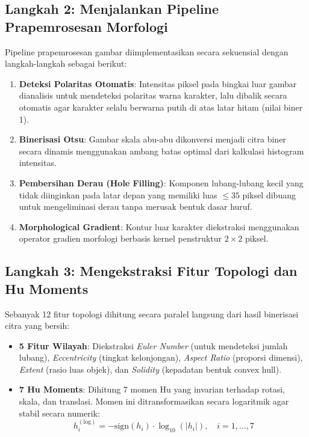 \documentclass[12pt,a4paper]{article}
\begin{document}
\subsection*{Langkah 2: Menjalankan Pipeline Prapemrosesan Morfologi}
Pipeline prapemrosesan gambar diimplementasikan secara sekuensial dengan langkah-langkah sebagai berikut:
\begin{enumerate}
    \item \textbf{Deteksi Polaritas Otomatis}: Intensitas piksel pada bingkai luar gambar dianalisis untuk mendeteksi polaritas warna karakter, lalu dibalik secara otomatis agar karakter selalu berwarna putih di atas latar hitam (nilai biner 1).
    \item \textbf{Binerisasi Otsu}: Gambar skala abu-abu dikonversi menjadi citra biner secara dinamis menggunakan ambang batas optimal dari kalkulasi histogram intensitas.
    \item \textbf{Pembersihan Derau (Hole Filling)}: Komponen lubang-lubang kecil yang tidak diinginkan pada latar depan yang memiliki luas $\le 35$ piksel dibuang untuk mengeliminasi derau tanpa merusak bentuk dasar huruf.
    \item \textbf{Morphological Gradient}: Kontur luar karakter diekstraksi menggunakan operator gradien morfologi berbasis kernel penstruktur $2 \times 2$ piksel.
\end{enumerate}

\subsection*{Langkah 3: Mengekstraksi Fitur Topologi dan Hu Moments}
Sebanyak 12 fitur topologi dihitung secara paralel langsung dari hasil binerisasi citra yang bersih:
\begin{itemize}
    \item \textbf{5 Fitur Wilayah}: Diekstraksi \textit{Euler Number} (untuk mendeteksi jumlah lubang), \textit{Eccentricity} (tingkat kelonjongan), \textit{Aspect Ratio} (proporsi dimensi), \textit{Extent} (rasio luas objek), dan \textit{Solidity} (kepadatan bentuk convex hull).
    \item \textbf{7 Hu Moments}: Dihitung 7 momen Hu yang invarian terhadap rotasi, skala, dan translasi. Momen ini ditransformasikan secara logaritmik agar stabil secara numerik:
    \begin{equation*}
        h_i^{(\text{log})} = -\text{sign}(h_i) \cdot \log_{10}(|h_i|), \quad i = 1, \ldots, 7
    \end{equation*}
\end{itemize}
\end{document}
